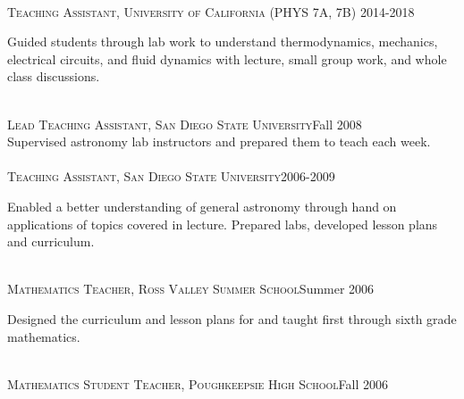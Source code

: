 \documentclass[10pt]{cv}
\begin{document}
\begin{llist}
\\
\textsc{Teaching Assistant, University of California} (PHYS 7A, 7B) \hfill 2014-2018\\
\begin{minipage}[l]{0.7\textwidth}\vspace{0.15cm}
Guided students through lab work to understand thermodynamics, mechanics, electrical circuits, and fluid dynamics with lecture, small group work, and whole class discussions.\\
\end{minipage}\vspace{0.15cm}
\\
\textsc{Lead Teaching Assistant, San Diego State University}\hfill Fall 2008\\
Supervised astronomy lab instructors and prepared them to teach each week. \\
\\
\textsc{Teaching Assistant, San Diego State University}\hfill 2006-2009\\
\begin{minipage}[l]{0.7\textwidth}\vspace{0.15cm}
Enabled a better understanding of general astronomy through hand on applications of topics covered in lecture. Prepared labs, developed lesson plans and curriculum.\\
\end{minipage}\vspace{0.15cm}
\\
\textsc{Mathematics Teacher, Ross Valley Summer School}\hfill Summer 2006\\
\begin{minipage}[l]{0.7\textwidth}\vspace{0.15cm}
Designed the curriculum and lesson plans for and taught first through sixth grade mathematics.\\
\end{minipage}\vspace{0.15cm}
\\
\textsc{Mathematics Student Teacher, Poughkeepsie High School}\hfill Fall 2006\\
\begin{minipage}[l]{0.7\textwidth}\vspace{0.15cm}

\end{minipage}
\end{llist}
\end{document}
